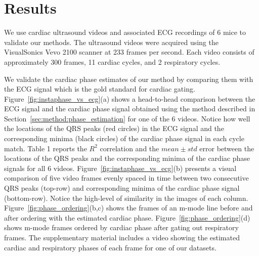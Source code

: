 \documentclass[runningheads,a4paper]{llncs}
\begin{document}
\section{Results}
\label{sec:results}
%
We use cardiac ultrasound videos and associated ECG recordings of 6 mice to validate our methods. The ultrasound videos were acquired using the VisualSonics Vevo 2100 scanner at 233 frames per second. Each video consists of approximately 300 frames, 11 cardiac cycles, and 2 respiratory cycles.

	We validate the cardiac phase estimates of our method by comparing them with the ECG signal which is the gold standard for cardiac gating. Figure~\ref{fig:instaphase_vs_ecg}(a) shows a head-to-head comparison between the ECG signal and the cardiac phase signal obtained using the method described in Section~\ref{sec:method:phase_estimation} for one of the 6 videos. Notice how well the locations of the  QRS peaks (red circles) in the ECG signal and the corresponding minima (black circles) of the cardiac phase signal in each cycle match. Table 1 reports the $R^2$ correlation and the $mean \pm std$ error between the locations of the QRS peaks and the corresponding minima of the cardiac phase signals for all 6 videos. Figure~\ref{fig:instaphase_vs_ecg}(b) presents a visual comparison of five video frames evenly spaced in time between two consecutive QRS peaks (top-row) and corresponding minima of the cardiac phase signal (bottom-row). Notice the high-level of similarity in the images of each column.  Figure~\ref{fig:phase_ordering}(b,c) shows the frames of an m-mode line before and after ordering with the estimated cardiac phase. Figure~\ref{fig:phase_ordering}(d) shows m-mode frames ordered by cardiac phase after gating out respiratory frames. The supplementary material includes a video showing the estimated cardiac and respiratory phases of each frame for one of our datasets.
	
\end{document}
